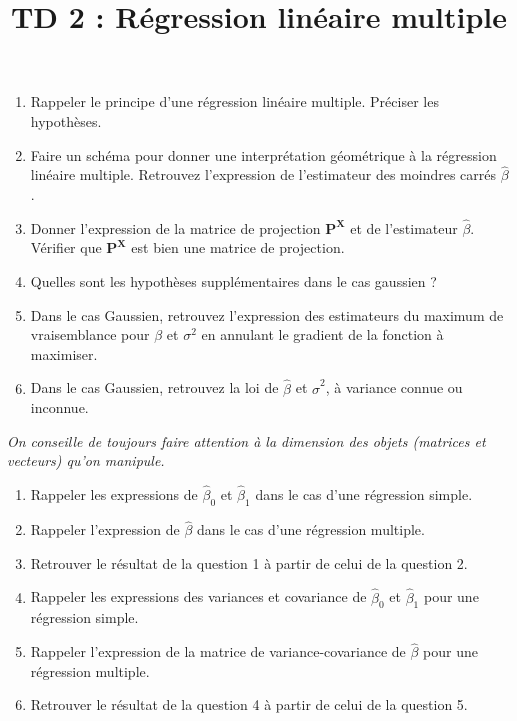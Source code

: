 \documentclass{../headers/td_upc}
\title{TD 2 : Régression linéaire multiple}
\providecommand{\1}{\mathds{1}}
\begin{document}
	\maketitle
	
	
	
	\begin{enumerate}
		\item Rappeler le principe d'une régression linéaire multiple. Préciser les hypothèses.
		\item Faire un schéma pour donner une interprétation géométrique à la régression linéaire multiple. Retrouvez l'expression de l'estimateur des moindres carrés $\hat \beta$.
		\item Donner l'expression de la matrice de projection $\mathbf{P}^{\mathbf{X}}$ et de l'estimateur $\hat \beta$. Vérifier que $\mathbf{P}^{\mathbf{X}}$ est bien une matrice de projection.
		\item Quelles sont les hypothèses supplémentaires dans le cas gaussien ?
		\item Dans le cas Gaussien, retrouvez l'expression des estimateurs du maximum de vraisemblance pour $\beta$ et $\sigma^2$ en annulant le gradient de la fonction à maximiser.
		\item Dans le cas Gaussien, retrouvez la loi de $\hat \beta$ et $\hat \sigma^2$, à variance connue ou inconnue.
	\end{enumerate}
	\textit{On conseille de toujours faire attention à la dimension des objets (matrices et vecteurs) qu'on manipule.}
	
	
	\begin{enumerate}
		\item Rappeler les expressions de $\hat \beta_0$ et $\hat \beta_1$ dans le cas d'une régression simple.
		\item Rappeler l'expression de $\hat \beta$ dans le cas d'une régression multiple.
		\item Retrouver le résultat de la question 1 à partir de celui de la question 2.
		\item Rappeler les expressions des variances et covariance de $\hat \beta_0$ et $\hat \beta_1$ pour une régression simple.
		\item Rappeler l'expression de la matrice de variance-covariance de $\hat \beta$ pour une régression multiple.
		\item Retrouver le résultat de la question 4 à partir de celui de la question 5.
	\end{enumerate}
\end{document}
